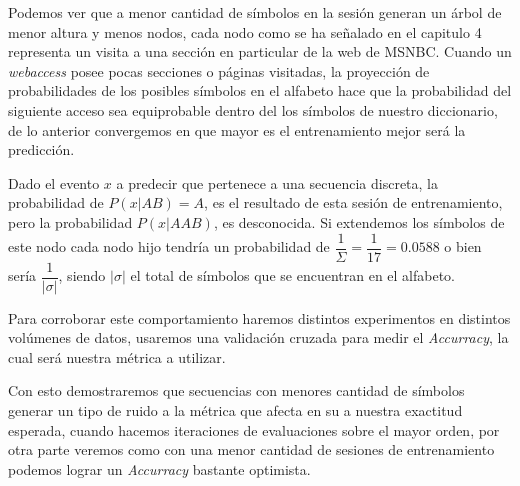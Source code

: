 Podemos ver que a menor cantidad de símbolos en la sesión generan un árbol de menor altura y menos nodos, cada nodo como se ha señalado en el capitulo 4 representa un visita a una sección en particular de la web de MSNBC. Cuando un \emph{webaccess} posee  pocas secciones o páginas visitadas, la proyección de probabilidades de los posibles símbolos en el alfabeto hace que la probabilidad del siguiente acceso sea equiprobable dentro del los símbolos de nuestro diccionario, de lo anterior convergemos en que mayor es el entrenamiento mejor será la predicción.

Dado el evento $x$  a predecir que pertenece a una secuencia discreta, la probabilidad de $P( x| AB  ) = A $, es el resultado de esta sesión de entrenamiento, pero la probabilidad $P(x | AAB) $, es desconocida.  Si extendemos los símbolos de este nodo cada nodo hijo tendría un probabilidad de $ \dfrac{1}{\Sigma} = \dfrac{1}{17} = 0.0588 $ o bien sería  $\dfrac{1}{ |\sigma| }$, siendo $|\sigma|$ el total de símbolos que se encuentran en el alfabeto. 

Para corroborar este comportamiento haremos distintos experimentos en distintos volúmenes de datos, usaremos una validación cruzada para medir el \emph{Accurracy}, la cual será nuestra métrica a utilizar.

Con esto demostraremos que secuencias con menores cantidad de símbolos generar un tipo de ruido a la métrica  que afecta en su a nuestra exactitud esperada, cuando hacemos iteraciones de evaluaciones sobre el mayor orden, por otra parte veremos como con una menor cantidad de sesiones de entrenamiento podemos lograr un \emph{Accurracy} bastante optimista.



